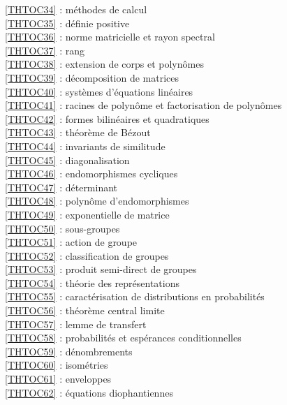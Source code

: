 \ref {THTOC34} : méthodes de calcul\\
\ref {THTOC35} : définie positive\\
\ref {THTOC36} : norme matricielle et rayon spectral\\
\ref {THTOC37} : rang\\
\ref {THTOC38} : extension de corps et polynômes\\
\ref {THTOC39} : décomposition de matrices\\
\ref {THTOC40} : systèmes d'équations linéaires\\
\ref {THTOC41} : racines de polynôme et factorisation de polynômes\\
\ref {THTOC42} : formes bilinéaires et quadratiques\\
\ref {THTOC43} : théorème de Bézout\\
\ref {THTOC44} : invariants de similitude\\
\ref {THTOC45} : diagonalisation\\
\ref {THTOC46} : endomorphismes cycliques\\
\ref {THTOC47} : déterminant\\
\ref {THTOC48} : polynôme d'endomorphismes\\
\ref {THTOC49} : exponentielle de matrice\\
\ref {THTOC50} : sous-groupes\\
\ref {THTOC51} : action de groupe\\
\ref {THTOC52} : classification de groupes\\
\ref {THTOC53} : produit semi-direct de groupes\\
\ref {THTOC54} : théorie des représentations\\
\ref {THTOC55} : caractérisation de distributions en probabilités\\
\ref {THTOC56} : théorème central limite\\
\ref {THTOC57} : lemme de transfert\\
\ref {THTOC58} : probabilités et espérances conditionnelles\\
\ref {THTOC59} : dénombrements\\
\ref {THTOC60} : isométries\\
\ref {THTOC61} : enveloppes\\
\ref {THTOC62} : équations diophantiennes\\
